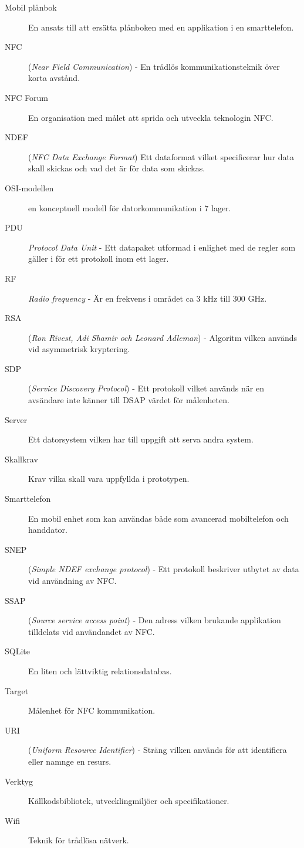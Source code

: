 \documentclass[11pt]{article}
\begin{document}
\begin{description}
\item[Mobil plånbok] En ansats till att ersätta plånboken med en applikation i en smarttelefon.
\item[NFC] (\textit{Near Field Communication}) - En trådlös kommunikationsteknik över korta avstånd. 
\item[NFC Forum] En organisation med målet att sprida och utveckla teknologin NFC.
\item[NDEF] (\textit{NFC Data Exchange Format}) Ett dataformat vilket specificerar hur data skall skickas och vad det är för data som skickas.
\item[OSI-modellen] en konceptuell modell för datorkommunikation i 7 lager.
\item[PDU] \textit{Protocol Data Unit} - Ett datapaket utformad i enlighet med de regler som gäller i för ett protokoll inom ett lager.
\item[RF] \textit{Radio frequency} - Är en frekvens i området ca 3 kHz till 300 GHz.
\item[RSA] (\textit{Ron Rivest, Adi Shamir och Leonard Adleman}) - Algoritm vilken används vid asymmetrisk kryptering.
\item[SDP] (\textit{Service Discovery Protocol}) - Ett protokoll vilket används när en avsändare inte känner till DSAP värdet för målenheten.
\item[Server] Ett datorsystem vilken har till uppgift att serva andra system.
\item[Skallkrav] Krav vilka skall vara uppfyllda i prototypen.
\item[Smarttelefon] En mobil enhet som kan användas både som avancerad mobiltelefon och handdator.
\item[SNEP] (\textit{Simple NDEF exchange protocol}) - Ett protokoll beskriver utbytet av data vid användning av NFC.
\item[SSAP] (\textit{Source service access point}) - Den adress vilken brukande applikation tilldelats vid användandet av NFC.
\item[SQLite] En liten och lättviktig relationsdatabas.
\item[Target] Målenhet för NFC kommunikation.
\item[URI] (\textit{Uniform Resource Identifier}) - Sträng vilken används för att identifiera eller namnge en resurs.
\item[Verktyg] Källkodsbibliotek, utvecklingmiljöer och specifikationer.
\item[Wifi] Teknik för trådlösa nätverk.
\end{description}
\newpage
\end{document}
